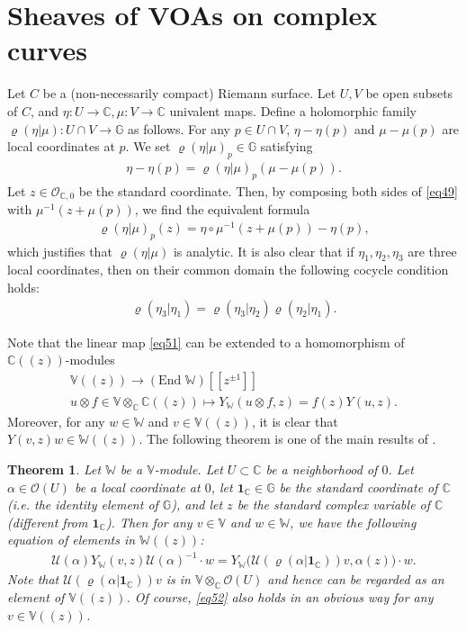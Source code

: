 \documentclass[12pt,a4paper,notitlepage]{report}
\theoremstyle{definition}
\theoremstyle{plain}
\newtheorem{thm}[df]{Theorem}
\newcommand{\mc}{\mathcal}
\newcommand{\id}{\mathbf{1}}
\newcommand{\scr}{\mathscr}
\newcommand{\mbb}{\mathbb}
\newcommand{\Vbb}{\mathbb V}
\newcommand{\Wbb}{\mathbb W}
\newcommand{\Gbb}{\mathbb G}
\newcommand{\Cbb}{\mathbb C}
\numberwithin{equation}{section}
\begin{document}
\section{Sheaves of VOAs on complex curves}\label{lb23}







Let $C$ be a (non-necessarily compact) Riemann surface. Let $U,V$ be open subsets of $C$, and  $\eta:U\rightarrow\Cbb,\mu:V\rightarrow\Cbb$ univalent maps.  Define a holomorphic family $\varrho(\eta|\mu):U\cap V\rightarrow\Gbb$  as follows. For any $p\in U\cap V$, $\eta-\eta(p)$ and $\mu-\mu(p)$ are local coordinates at $p$. We set $\varrho(\eta|\mu)_p\in\Gbb$ satisfying
\begin{align}
\eta-\eta(p)=\varrho(\eta|\mu)_p(\mu-\mu(p)).\label{eq49}
\end{align}
Let $z\in\scr O_{\Cbb,0}$ be the standard coordinate. Then, by composing both sides of \eqref{eq49} with $\mu^{-1}(z+\mu(p))$, we find the equivalent formula
\begin{align}
\varrho(\eta|\mu)_p(z)=\eta\circ\mu^{-1}(z+\mu(p))-\eta(p),
\end{align}
which justifies that $\varrho(\eta|\mu)$ is analytic. It is also clear that if $\eta_1,\eta_2,\eta_3$ are three local coordinates, then on their common domain the following cocycle condition holds:
\begin{align}
\varrho(\eta_3|\eta_1)=\varrho(\eta_3|\eta_2)\varrho(\eta_2|\eta_1).
\end{align}



Note that the linear map \eqref{eq51} can be extended to a homomorphism of $\Cbb((z))$-modules
\begin{gather}
\mbb V((z))\rightarrow(\text{End }\mbb W)[[z^{\pm1}]]\nonumber\\
u\otimes f\in \Vbb\otimes_{\Cbb}\Cbb((z))\mapsto Y_{\Wbb}(u\otimes f,z)=f(z)Y(u,z).\label{eq228}
\end{gather}
Moreover, for any $w\in\Wbb$ and $v\in\Vbb((z))$, it is clear that $Y(v,z)w\in\Wbb((z))$. The following theorem is one of the main results of \cite{Hua97}.

\begin{thm}\label{lb31}
Let $\Wbb$ be a $\Vbb$-module. Let $U\subset\Cbb$ be a neighborhood of $0$. Let $\alpha\in\scr O(U)$ be a local coordinate at $0$, let $\id_\Cbb\in\Gbb$ be the standard coordinate of $\Cbb$ (i.e.  the identity element of $\Gbb$), and let $z$ be the standard complex variable of $\Cbb$ (different from $\id_\Cbb$). Then for any $v\in\Vbb$ and $w\in\Wbb$, we have the following equation of elements in $\Wbb((z))$:
\begin{align}
\mc U(\alpha)Y_\Wbb(v,z)\mc U(\alpha)^{-1}\cdot w=Y_{\Wbb}\big(\mc U(\varrho(\alpha|\id_\Cbb))v,\alpha(z)\big)\cdot w.\label{eq52}
\end{align}
Note that $\mc U(\varrho(\alpha|\id_\Cbb))v$ is in $\Vbb\otimes_{\Cbb}\scr O(U)$ and hence can be regarded as an element of $\Vbb((z))$. Of course, \eqref{eq52} also holds in an obvious way for any $v\in\Vbb((z))$.
\end{thm}
\end{document}

